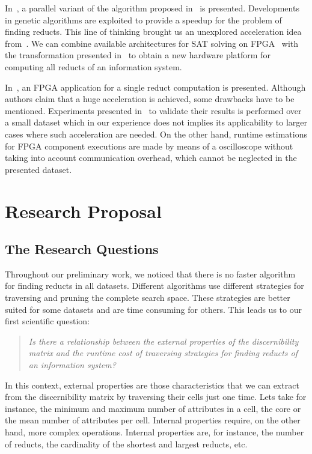 \documentclass[authoryear,11pt]{elsarticle}
\begin{document}
  In~\citep{Wroblewski98}, a parallel variant of the algorithm proposed in~\citep{Wroblewski95} is presented.
  Developments in genetic algorithms are exploited to provide a speedup for the problem of finding reducts.
  This line of thinking brought us an unexplored acceleration idea from~\citep{Jensen14}. We can combine 
  available architectures for SAT solving on FPGA~\citep{Safar07,Kanazawa11} with the transformation
  presented in~\citep{Jensen14} to obtain a new hardware platform for computing all reducts of an information 
  system.
  
  In~\citep{Grzes13,Kopczynski14}, an FPGA application for a single reduct computation is presented. Although
  authors claim that a huge acceleration is achieved, some drawbacks have to be mentioned. Experiments presented 
  in~\citep{Kopczynski14} to validate their results is performed over a small dataset which in our experience 
  does not implies its applicability to larger cases where such acceleration are needed. On the other hand, 
  runtime estimations for FPGA component executions are made by means of a oscilloscope without taking into 
  account communication overhead, which cannot be neglected in the presented dataset.
\section{Research Proposal}\label{ResearchProposal} 
\subsection{The Research Questions}\label{ResearchQuestions} 
  Throughout our preliminary work, we noticed that there is no faster algorithm for finding reducts in 
  all datasets. Different algorithms use different strategies for traversing and pruning the complete search 
  space. These strategies are better suited for some datasets and are time consuming for others. This leads 
  us to our first scientific question:
  
\begin{quote}
  \emph{Is there a relationship between the external properties of the discernibility matrix and the runtime 
  		cost of traversing strategies for finding reducts of an information system?}
\end{quote}
  		
  In this context, external properties are those characteristics that we can extract from the discernibility
  matrix by traversing their cells just one time. Lets take for instance, the minimum and maximum number of
  attributes in a cell, the core or the mean number of attributes per cell. Internal properties require, on 
  the other hand, more complex operations. Internal properties are, for instance, the number of reducts, the
  cardinality of the shortest and largest reducts, etc.
  
\end{document}

